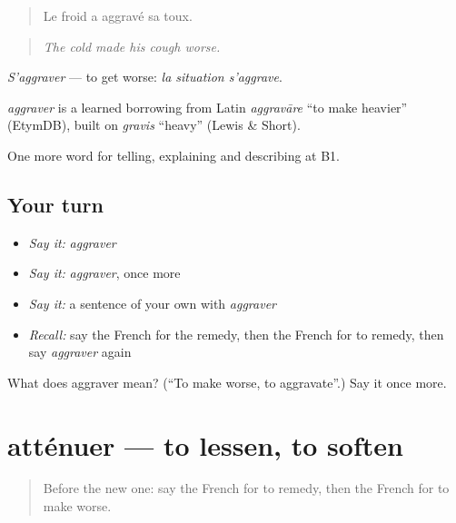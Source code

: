 \begin{quote}
Le froid a aggravé sa toux.
\end{quote}

\begin{quote}
\emph{The cold made his cough worse.}
\end{quote}

\emph{S'aggraver} — to get worse: \emph{la situation s'aggrave}.

\begin{cousinweb}
\emph{aggraver} is a learned borrowing from Latin \emph{aggravāre} \textquotedblleft{}to make heavier\textquotedblright{} (EtymDB), built on \emph{gravis} \textquotedblleft{}heavy\textquotedblright{} (Lewis \& Short).
\end{cousinweb}

\begin{grammarlens}[title={What you've built}]
One more word for telling, explaining and describing at B1.
\end{grammarlens}

\subsection*{Your turn}
\begin{itemize}
\raggedright
  \item \emph{Say it:} \emph{aggraver}
  \item \emph{Say it:} \emph{aggraver}, once more
  \item \emph{Say it:} a sentence of your own with \emph{aggraver}
  \item \emph{Recall:} say the French for the remedy, then the French for to remedy, then say \emph{aggraver} again
\end{itemize}

\begin{tcolorbox}[breakable,colback=teal!4,colframe=teal!35!black,title={Before you move on}]
What does aggraver mean? (\textquotedblleft{}To make worse, to aggravate\textquotedblright{}.) Say it once more.
\end{tcolorbox}
\section[atténuer]{atténuer — to lessen, to soften}

\label{lesson:FR-C353-attenuer}



\begin{quote}
Before the new one: say the French for to remedy, then the French for to make worse.
\end{quote}

